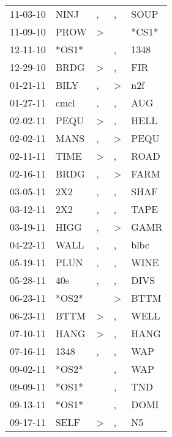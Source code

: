 \begin{supertabular}{lllll}
 11-03-10 &   NINJ &                , &                , &   SOUP \\
 11-09-10 &   PROW &     \textgreater &                  &  *CS1* \\
 12-11-10 &  *OS1* &                  &                , &   1348 \\
 12-29-10 &   BRDG &     \textgreater &                , &    FIR \\
 01-21-11 &   BILY &                , &     \textgreater &    n2f \\
 01-27-11 &   cmcl &                , &                , &    AUG \\
 02-02-11 &   PEQU &     \textgreater &                , &   HELL \\
 02-02-11 &   MANS &                , &     \textgreater &   PEQU \\
 02-11-11 &   TIME &     \textgreater &                , &   ROAD \\
 02-16-11 &   BRDG &                , &     \textgreater &   FARM \\
 03-05-11 &    2X2 &                , &                , &   SHAF \\
 03-12-11 &    2X2 &                , &                , &   TAPE \\
 03-19-11 &   HIGG &                , &     \textgreater &   GAMR \\
 04-22-11 &   WALL &                , &                , &   blbc \\
 05-19-11 &   PLUN &                , &                , &   WINE \\
 05-28-11 &    40s &                , &                , &   DIVS \\
 06-23-11 &  *OS2* &                  &     \textgreater &   BTTM \\
 06-23-11 &   BTTM &     \textgreater &                , &   WELL \\
 07-10-11 &   HANG &     \textgreater &                , &   HANG \\
 07-16-11 &   1348 &                , &                , &    WAP \\
 09-02-11 &  *OS2* &                  &                , &    WAP \\
 09-09-11 &  *OS1* &                  &                , &    TND \\
 09-13-11 &  *OS1* &                  &                , &   DOMI \\
 09-17-11 &   SELF &     \textgreater &                , &     N5 \\

\end{supertabular}
